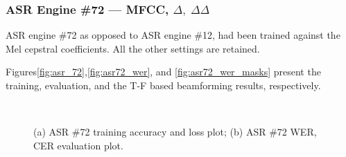 \subsubsection{ASR Engine \#72 --- MFCC, \(\Delta,\;\Delta\Delta\)}
ASR engine \#72 as opposed to ASR engine \#12, had been trained against
the Mel cepstral coefficients. All the other settings are retained.

\bigskip

Figures\;\ref{fig:asr_72},\;\ref{fig:asr72_wer}, and \ref{fig:asr72_wer_masks}
present the training, evaluation, 
and the T-F based beamforming results, respectively. 
\begin{figure}[H]
    \centering
    \\
    \vspace{-0.3cm}
    \caption{(a) ASR \#72 training accuracy and loss plot;\;\;
        (b) ASR \#72 WER, CER evaluation plot.}\label{fig:asr72_wer_subplot} 
\end{figure}

